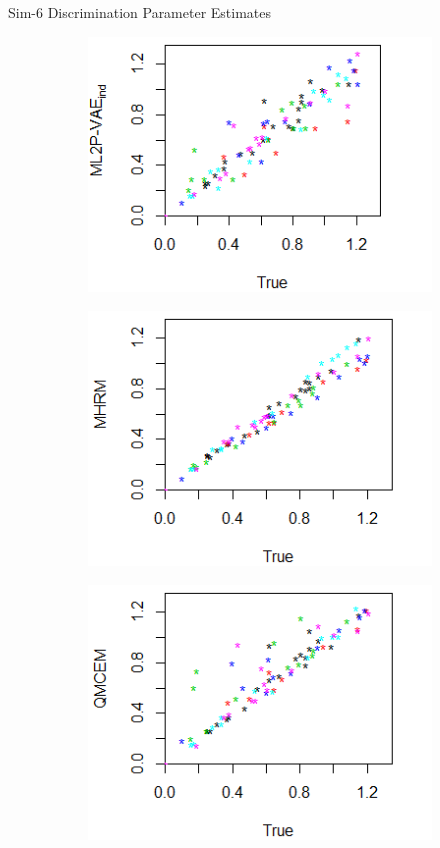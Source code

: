 \documentclass{beamer}
\theoremstyle{definition}
\begin{document}
\begin{frame}{Sim-6 Discrimination Parameter Estimates}
\begin{figure}[h]
\begin{subfigure}{.32\textwidth}
      \includegraphics[width=.9\linewidth]{../img/ml_journal_results/6skills/vae_ind_disc_6skills.png}
    \end{subfigure}
    \begin{subfigure}{.32\textwidth}
      \centering
      \includegraphics[width=.9\linewidth]{../img/ml_journal_results/6skills/mhrm_disc_6skills.png}
    \end{subfigure}
    \begin{subfigure}{.32\textwidth}
      \centering
      \includegraphics[width=.9\linewidth]{../img/ml_journal_results/6skills/qmcem_disc_6skills.png}

\end{subfigure}
\end{figure}
\end{frame}
\end{document}
